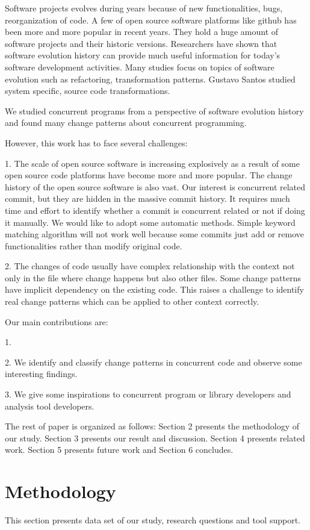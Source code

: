 \documentclass[conference]{IEEEtran}
\begin{document}
Software projects evolves during years because of new functionalities, bugs, reorganization of code. A few of open source software platforms like github has been more and more popular in recent years. They hold a huge amount of software projects and their historic versions. Researchers have shown that software evolution history can provide much useful information for today's software development activities. Many studies focus on topics of software evolution such as refactoring, transformation patterns. Gustavo Santos \cite{conf/icsm/SantosAEDV15} studied system specific, source code transformations.

We studied concurrent programs from a perspective of software evolution history and found many change patterns about concurrent programming.

However, this work has to face several challenges:

1. The scale of open source software is increasing explosively as a result of some open source code platforms have become more and more popular. The change history of the open source software is also vast. Our interest is concurrent related commit, but they are hidden in the massive commit history. It requires much time and effort to identify whether a commit is concurrent related or not if doing it manually. We would like to adopt some automatic methods. Simple keyword matching algorithm will not work well because some commits just add or remove functionalities rather than modify original code.

2. The changes of code usually have complex relationship with the context not only in the file where change happens but also other files. Some change patterns have implicit dependency on the existing code. This raises a challenge to identify real change patterns which can be applied to other context correctly.

Our main contributions are:

1. 

2. We identify and classify change patterns in concurrent code and observe some interesting findings.

3. We give some inspirations to concurrent program or library developers and analysis tool developers.

The rest of paper is organized as follows: Section 2 presents the methodology of our study. Section 3 presents our result and discussion. Section 4 presents related work. Section 5 presents future work and Section 6 concludes.

\section{Methodology}
This section presents data set of our study, research questions and tool support.
\end{document}
